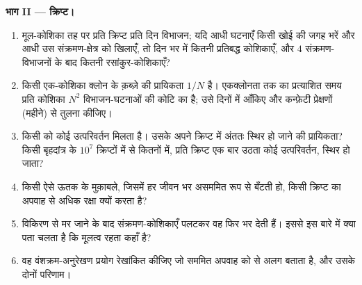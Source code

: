 \begin{problem}
\medskip
\noindent\textbf{भाग II --- क्रिप्ट।}
\begin{enumerate}[resume]
  \item मूल-कोशिका तह पर प्रति क्रिप्ट प्रति दिन विभाजन; यदि आधी
        घटनाएँ किसी खोई  की जगह भरें और आधी उस
        संक्रमण-क्षेत्र को खिलाएँ, तो दिन भर में कितनी प्रतिबद्ध
        कोशिकाएँ, और $4$ संक्रमण-विभाजनों के बाद कितनी रसांकुर-कोशिकाएँ?
  \item किसी एक-कोशिका क्लोन के क़ब्ज़े की प्रायिकता $1/N$ है। एकक्लोनता
        तक का प्रत्याशित समय प्रति कोशिका $N^{2}$ विभाजन-घटनाओं की कोटि
        का है; उसे दिनों में आँकिए और कन्फ़ेटी प्रेक्षणों (महीने) से
        तुलना कीजिए।
  \item किसी  को कोई उत्परिवर्तन मिलता है। उसके अपने क्रिप्ट
        में अंततः स्थिर हो जाने की प्रायिकता? किसी बृहदांत्र के
        $10^{7}$ क्रिप्टों में से कितनों में, प्रति क्रिप्ट एक बार उठता
        कोई उत्परिवर्तन, स्थिर हो जाता?
  \item किसी ऐसे ऊतक के मुक़ाबले, जिसमें हर  जीवन भर असममित
        रूप से बँटती हो, किसी क्रिप्ट का अपवाह  से अधिक रक्षा
        क्यों करता है?
  \item विकिरण से  मर जाने के बाद संक्रमण-कोशिकाएँ पलटकर वह
         फिर भर देती हैं। इससे इस बारे में क्या पता चलता है कि
        मूलत्व रहता कहाँ है?
  \item वह वंशक्रम-अनुरेखण प्रयोग रेखांकित कीजिए जो सममित अपवाह को
         से अलग बताता है, और उसके दोनों परिणाम।
\end{enumerate}


\end{problem}
